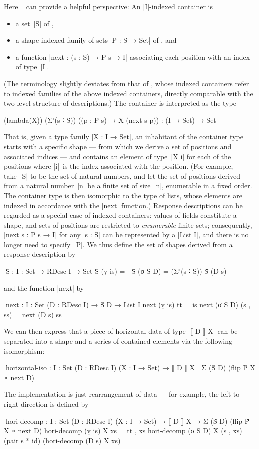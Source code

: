 Here ~\citep[Chapter~8]{Morris-thesis} can provide a helpful perspective:
An |I|-indexed container is
\begin{itemize}
\item a set~|S| of ,
\item a shape-indexed family of sets |P : S → Set| of , and
\item a function |next : (s : S) → P s → I| associating each position with an index of type~|I|.
\end{itemize}
(The terminology slightly deviates from that of \citeauthor{Morris-thesis}, whose indexed containers refer to indexed families of the above indexed containers, directly comparable with the two-level structure of descriptions.)
The container is interpreted as the type
\begin{code}
(lambda(X)) (Σ'(s ∶ S)) ((p : P s) → X (next s p)) : (I → Set) → Set
\end{code}
That is, given a type family |X : I → Set|, an inhabitant of the container type starts with a specific shape --- from which we derive a set of positions and associated indices --- and contains an element of type~|X i| for each of the positions where |i|~is the index associated with the position.
(For example, take~|S| to be the set of natural numbers, and let the set of positions derived from a natural number~|n| be a finite set of size~|n|, enumerable in a fixed order.
The container type is then isomorphic to the type of lists, whose elements are indexed in accordance with the |next| function.)
Response descriptions can be regarded as a special case of indexed containers: values of fields constitute a shape, and sets of positions are restricted to \emph{enumerable} finite sets; consequently, |next s : P s → I| for any |s : S| can be represented by a |List I|, and there is no longer need to specify~|P|.
We thus define the set of shapes derived from a response description by
\begin{code}
^^^Ṡ : {I : Set} → RDesc I → Set
Ṡ (ṿ is)   = ⊤
Ṡ (σ S D)  = (Σ'(s ∶ S)) Ṡ (D s)
\end{code}
and the function |next| by
\begin{code}
^^^next : {I : Set} (D : RDesc I) → Ṡ D → List I
next (ṿ is)   tt        = is
next (σ S D)  (s , ss)  = next (D s) ss
\end{code}
We can then express that a piece of horizontal data of type |⟦ D ⟧ X| can be separated into a shape and a series of contained elements via the following isomorphism:
\begin{code}
^^^horizontal-iso :  {I : Set} (D : RDesc I) (X : I → Set) →
                     ⟦ D ⟧ X ≅ Σ (Ṡ D) (flip Ṗ X ∘ next D)
\end{code}
The implementation is just rearrangement of data --- for example, the left-to-right direction is defined by
\begin{code}
^^^hori-decomp :  {I : Set} (D : RDesc I) (X : I → Set) →
                  ⟦ D ⟧ X → Σ (Ṡ D) (flip Ṗ X ∘ next D)
hori-decomp (ṿ is)   X xs        = tt , xs
hori-decomp (σ S D)  X (s , xs)  = (pair s * id) (hori-decomp (D s) X xs)
\end{code}

